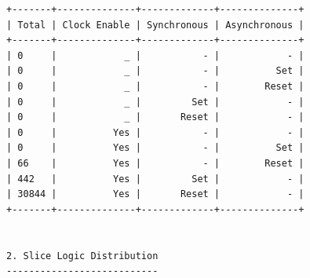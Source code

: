 \documentclass[11pt]{article}
\begin{document}
{\begin{verbatim}
+-------+--------------+-------------+--------------+
| Total | Clock Enable | Synchronous | Asynchronous |
+-------+--------------+-------------+--------------+
| 0     |            _ |           - |            - |
| 0     |            _ |           - |          Set |
| 0     |            _ |           - |        Reset |
| 0     |            _ |         Set |            - |
| 0     |            _ |       Reset |            - |
| 0     |          Yes |           - |            - |
| 0     |          Yes |           - |          Set |
| 66    |          Yes |           - |        Reset |
| 442   |          Yes |         Set |            - |
| 30844 |          Yes |       Reset |            - |
+-------+--------------+-------------+--------------+


2. Slice Logic Distribution
---------------------------
\end{verbatim}
}
\end{document}
